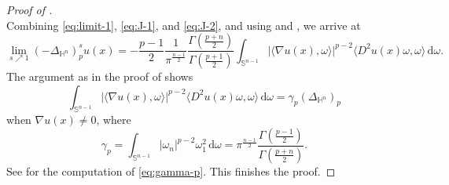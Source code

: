 \documentclass[11pt]{amsart}
\theoremstyle{plain}
\theoremstyle{definition}
\numberwithin{equation}{section}
\begin{document}
\begin{proof} [Proof of ]
\begin{equation}
\end{equation}
Combining \eqref{eq:limit-1}, \eqref{eq:J-1}, and \eqref{eq:J-2}, and using  and , we arrive at
\begin{equation*}
\lim_{s\nearrow 1} (-\Delta_{\mathbb{H}^{n}})^{s}_{p} u(x) = -\frac{p-1}{2} \frac{1}{\pi^{\frac{n-1}{2}}} \frac{\Gamma(\frac{p+n}{2})}{\Gamma(\frac{p+1}{2})} \int_{\mathbb{S}^{n-1}} |\langle \nabla u(x), \omega \rangle|^{p-2} \langle D^{2}u(x) \omega, \omega \rangle \,\mathrm{d}\omega.
\end{equation*}
The argument as in the proof of \cite[Theorem 2.8]{BS22} shows
\begin{equation*}
\int_{\mathbb{S}^{n-1}} |\langle \nabla u(x), \omega \rangle|^{p-2} \langle D^{2}u(x) \omega, \omega \rangle \,\mathrm{d}\omega = \gamma_{p} (\Delta_{\mathbb{H}^{n}})_{p}
\end{equation*}
when $\nabla u(x) \neq 0$, where
\begin{equation} \label{eq:gamma-p}
\gamma_{p} = \int_{\mathbb{S}^{n-1}} |\omega_{n}|^{p-2} \omega_{1}^{2} \,\mathrm{d}\omega = \pi^{\frac{n-1}{2}} \frac{\Gamma(\frac{p-1}{2})}{\Gamma(\frac{p+n}{2})}.
\end{equation}
See \cite[Lemma 2.1]{IN10} for the computation of \eqref{eq:gamma-p}. This finishes the proof.
\end{proof}

\end{document}
